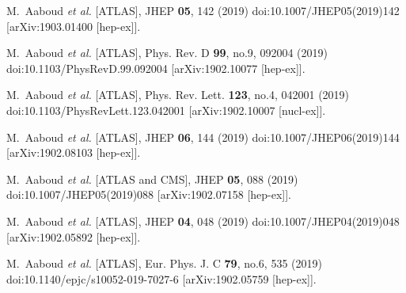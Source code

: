 \begin{thebibliography}{9}
M.~Aaboud \textit{et al.} [ATLAS],
JHEP \textbf{05}, 142 (2019)
doi:10.1007/JHEP05(2019)142
[arXiv:1903.01400 [hep-ex]].

M.~Aaboud \textit{et al.} [ATLAS],
Phys. Rev. D \textbf{99}, no.9, 092004 (2019)
doi:10.1103/PhysRevD.99.092004
[arXiv:1902.10077 [hep-ex]].

M.~Aaboud \textit{et al.} [ATLAS],
Phys. Rev. Lett. \textbf{123}, no.4, 042001 (2019)
doi:10.1103/PhysRevLett.123.042001
[arXiv:1902.10007 [nucl-ex]].

M.~Aaboud \textit{et al.} [ATLAS],
JHEP \textbf{06}, 144 (2019)
doi:10.1007/JHEP06(2019)144
[arXiv:1902.08103 [hep-ex]].

M.~Aaboud \textit{et al.} [ATLAS and CMS],
JHEP \textbf{05}, 088 (2019)
doi:10.1007/JHEP05(2019)088
[arXiv:1902.07158 [hep-ex]].

M.~Aaboud \textit{et al.} [ATLAS],
JHEP \textbf{04}, 048 (2019)
doi:10.1007/JHEP04(2019)048
[arXiv:1902.05892 [hep-ex]].

M.~Aaboud \textit{et al.} [ATLAS],
Eur. Phys. J. C \textbf{79}, no.6, 535 (2019)
doi:10.1140/epjc/s10052-019-7027-6
[arXiv:1902.05759 [hep-ex]].


\end{thebibliography}
